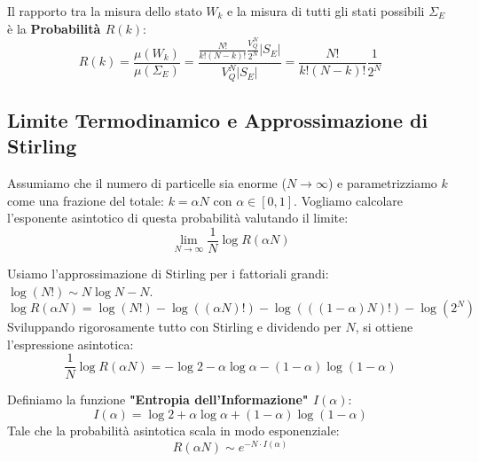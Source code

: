 \documentclass[openany]{book}
\theoremstyle{definition}
\theoremstyle{remark}
\begin{document}
Il rapporto tra la misura dello stato $W_k$ e la misura di tutti gli stati possibili $\Sigma_E$ è la \textbf{Probabilità $R(k)$}:
\begin{equation*}
    R(k) = \frac{\mu(W_k)}{\mu(\Sigma_E)} = \frac{ \frac{N!}{k!(N-k)!} \frac{V_Q^N}{2^N} |S_E| }{ V_Q^N |S_E| } = \frac{N!}{k!(N-k)!} \frac{1}{2^N}
\end{equation*}

\subsection*{Limite Termodinamico e Approssimazione di Stirling}
Assumiamo che il numero di particelle sia enorme ($N \to \infty$) e parametrizziamo $k$ come una frazione del totale: $k = \alpha N$ con $\alpha \in [0,1]$.
Vogliamo calcolare l'esponente asintotico di questa probabilità valutando il limite:
\begin{equation*}
    \lim_{N \to \infty} \frac{1}{N} \log R(\alpha N)
\end{equation*}

Usiamo l'approssimazione di Stirling per i fattoriali grandi: $\log(N!) \sim N \log N - N$.
\begin{equation*}
    \log R(\alpha N) = \log(N!) - \log((\alpha N)!) - \log(((1-\alpha)N)!) - \log(2^N)
\end{equation*}
Sviluppando rigorosamente tutto con Stirling e dividendo per $N$, si ottiene l'espressione asintotica:
\begin{equation*}
    \frac{1}{N} \log R(\alpha N) = -\log 2 - \alpha \log \alpha - (1-\alpha) \log(1-\alpha)
\end{equation*}

Definiamo la funzione \textbf{"Entropia dell'Informazione" $I(\alpha)$}:
\begin{equation}
    I(\alpha) = \log 2 + \alpha \log \alpha + (1-\alpha) \log(1-\alpha)
\end{equation}
Tale che la probabilità asintotica scala in modo esponenziale:
\begin{equation}
    R(\alpha N) \sim e^{-N \cdot I(\alpha)}
\end{equation}
\end{document}
